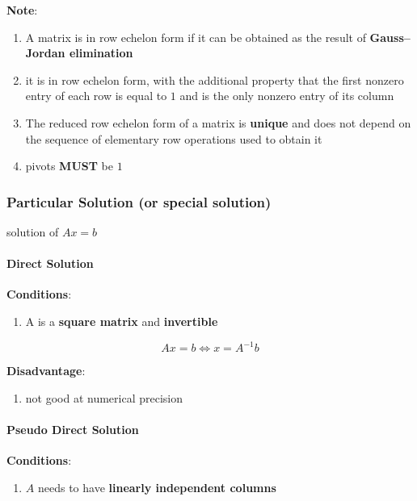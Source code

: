 \noindent\textbf{Note}:
\begin{enumerate}
    \item A matrix is in row echelon form if it can be obtained as the result of \textbf{Gauss–Jordan elimination}

    \item it is in row echelon form, with the additional property that the first nonzero entry of each row is equal to $1$ and is the only nonzero entry of its column

    \item The reduced row echelon form of a matrix is \textbf{unique} and does not depend on the sequence of elementary row operations used to obtain it

    \item pivots \textbf{MUST} be $1$
\end{enumerate}

\subsubsection{Particular Solution (or special solution) \cite{mfml-1}} \label{Particular Solution (or special solution)}
solution of $Ax = b$

\paragraph{Direct Solution  \cite{mfml-1}}

\textbf{Conditions}:
\begin{enumerate}
    \item A is a \textbf{square matrix} and \textbf{invertible}
\end{enumerate}

\[ Ax = b \Leftrightarrow x = A^{-1}b \]

\textbf{Disadvantage}:
\begin{enumerate}
    \item not good at numerical precision
\end{enumerate}


\paragraph{Pseudo Direct Solution \cite{mfml-1}}
\textbf{Conditions}:
\begin{enumerate}
    \item $A$ needs to have \textbf{linearly independent columns}
\end{enumerate}


